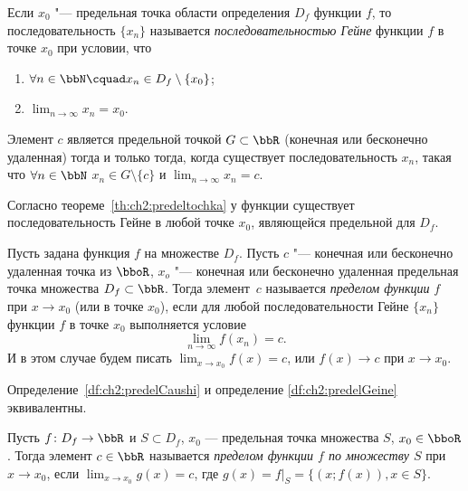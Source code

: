 \begin{defn}
Если $x_0$ "--- предельная точка области определения $D_f$ функции $f$, то последовательность $\{x_n\}$ называется \textit{последовательностью Гейне} функции $f$ в точке $x_0$ при условии, что
\begin{enumerate}
\item $\forall n \in \bbN\cquad x_n\in D_f\setminus \{x_0\}$;
\item $\lim_{n \to \infty}\limits x_n = x_0$.
\end{enumerate}
\end{defn}

\begin{thm}
\label{th:ch2:predeltochka}
Элемент $c$ является предельной точкой $G\subset \bbR$ (конечная или бесконечно удаленная) тогда и только тогда, когда существует последовательность ${x_n}$, такая что $\forall n \in \bbN$ $x_n \in G\setminus\{c\}$ и $\lim_{n \to \infty}\limits x_n = c$. 
\end{thm}

Согласно теореме~\ref{th:ch2:predeltochka} у функции существует последовательность Гейне в любой точке $x_0$, являющейся предельной для $D_f$.

\begin{defn}\label{df:ch2:predelGeine}
Пусть задана функция $f$ на множестве $D_f$. Пусть $c$ "--- конечная или бесконечно удаленная точка из $\bboR$, $x_o$ "--- конечная или бесконечно удаленная предельная точка  множества $D_f \subset \bbR$. Тогда элемент~$c$ называется \textit{пределом функции} $f$ при $x \to x_0$ (или в точке $x_0$), если для любой последовательности Гейне $\{x_n\}$ функции $f$ в точке $x_0$ выполняется условие 
$$\lim_{n \to \infty}\limits f(x_n) = c.$$ 
И в этом случае будем писать $\lim_{x \to x_0}\limits f(x) = c$, или $f(x)\to c$ при $x \to x_0$.
\end{defn}

\begin{thm}
Определение~\ref{df:ch2:predelCaushi} и определение \ref{df:ch2:predelGeine} эквивалентны.
\end{thm}

\begin{defn}
Пусть $f\colon D_f \to \bbR$ и $S \subset D_f$, $x_0$ --- предельная точка множества $S$, $x_0 \in \bboR$. Тогда элемент $c \in \bbR$ называется \textit{пределом функции $f$ по множеству $S$} при $x \to x_0$, если $\lim_{x \to x_0}\limits g(x) = c$, где $g(x)=\left.f\right|_S = \{(x;f(x)),x \in S\}$.
\end{defn}

